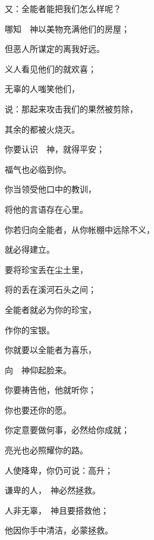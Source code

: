 {\par }{\Q 又{}：全能者能把我们怎么样呢？
\par }{\Q {}哪知　神以美物充满他们的房屋；
\par }{\Q 但恶人所谋定的离我好远。
\par }{\Q {}义人看见他们的{}就欢喜；
\par }{\Q 无辜的人嗤笑他们，
\par }{\Q {}说：那起来攻击我们的果然被剪除，
\par }{\Q 其余的都被火烧灭。
\par }{\BB \par }{\Q {}你要认识　神，就得平安；
\par }{\Q 福气也必临到你。
\par }{\Q {}你当领受他口中的教训，
\par }{\Q 将他的言语存在心里。
\par }{\Q {}你若归向全能者，从你帐棚中远除不义，
\par }{\Q 就必得建立。
\par }{\Q {}要将{}珍宝丢在尘土里，
\par }{\Q 将{}的{}丢在溪河石头之间；
\par }{\Q {}全能者就必为你的珍宝，
\par }{\Q 作你的宝银。
\par }{\Q {}你就要以全能者为喜乐，
\par }{\Q 向　神仰起脸来。
\par }{\Q {}你要祷告他，他就听你；
\par }{\Q 你也要还你的愿。
\par }{\Q {}你定意要做何事，必然给你成就；
\par }{\Q 亮光也必照耀你的路。
\par }{\Q {}人使{}降卑，你仍可说：{}高升；
\par }{\Q 谦卑的人，　神必然拯救。
\par }{\Q {}人非无辜，　神且要搭救他；
\par }{\Q 他因你手中清洁，必蒙拯救。

}
